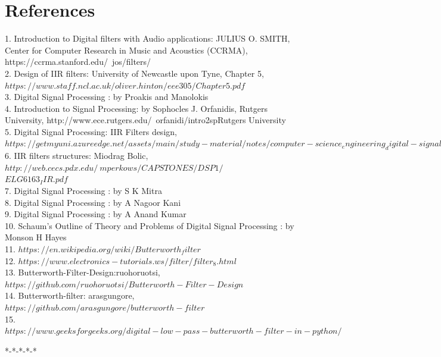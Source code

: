 \documentclass[journal,10pt,twocolumn]{article}
\begin{document}
\section{References}
\begin{flushleft}
    

\vspace{0.2cm}
1. Introduction to Digital filters with Audio applications: JULIUS O. SMITH, Center for Computer Research in Music and Acoustics (CCRMA), https://ccrma.stanford.edu/~jos/filters/ \\
\vspace{0.25cm}
2. Design of IIR filters: University of Newcastle upon Tyne, Chapter 5, $https://www.staff.ncl.ac.uk/oliver.hinton/eee305/Chapter5.pdf$\\
\vspace{0.25cm}
3. Digital Signal Processing : by Proakis and Manolokis\\
\vspace{0.25cm}
4. Introduction to Signal Processing: by Sophocles J. Orfanidis, Rutgers University, http://www.ece.rutgers.edu/~orfanidi/intro2spRutgers University\\
\vspace{0.25cm}
5. Digital Signal Processing: IIR Filters design, $https://getmyuni.azureedge.net/assets/main/study-material/notes/computer-science_engineering_digital-signal-processing_iir-filter-design_notes.pdf$\\
\vspace{0.20cm}
6. IIR filters structures: Miodrag Bolic,  $http://web.cecs.pdx.edu/~mperkows/CAPSTONES/DSP1/$ \\
$ELG6163_IIR.pdf$\\
\vspace{0.25cm}
7. Digital Signal Processing : by S K Mitra\\
\vspace{0.25cm}
8. Digital Signal Processing : by A Nagoor Kani\\
\vspace{0.25cm}
9. Digital Signal Processing : by A Anand Kumar\\
\vspace{0.25cm}
10. Schaum's Outline of Theory and Problems of Digital Signal Processing : by Monson H Hayes\\
\vspace{0.25cm}
11. $https://en.wikipedia.org/wiki/Butterworth_filter$\\
\vspace{0.25cm}
12. $https://www.electronics-tutorials.ws/filter/filter_8.html$\\
\vspace{0.25cm}
13. Butterworth-Filter-Design:ruohoruotsi, $https://github.com/ruohoruotsi/Butterworth-Filter-Design$\\
\vspace{0.25cm}
14. Butterworth-filter: arasgungore, $https://github.com/arasgungore/butterworth-filter$\\
\vspace{0.25cm}
15. $https://www.geeksforgeeks.org/digital-low-pass-butterworth-filter-in-python/$\\
\vspace{0.25cm}
\end{flushleft}
\begin{center}
*-*-*-*-*
\end{center}
\end{document}
